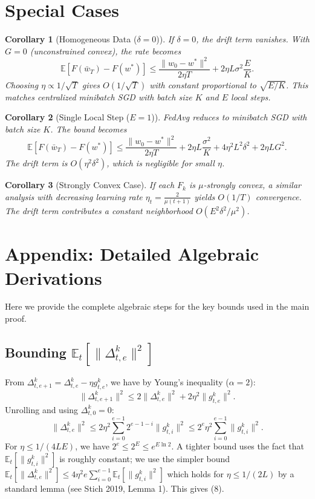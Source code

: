 \documentclass{article}
\newtheorem{corollary}{Corollary}
\begin{document}
\section*{Special Cases}
\begin{corollary}[Homogeneous Data ($\delta=0$)]
If $\delta=0$, the drift term vanishes. With $G=0$ (unconstrained convex), the rate becomes
\begin{equation}
\mathbb{E}[F(\bar{w}_T) - F(w^*)] \le \frac{\|w_0 - w^*\|^2}{2\eta T} + 2\eta L \sigma^2 \frac{E}{K}.
\end{equation}
Choosing $\eta \propto 1/\sqrt{T}$ gives $O(1/\sqrt{T})$ with constant proportional to $\sqrt{E/K}$. This matches centralized minibatch SGD with batch size $K$ and $E$ local steps.
\end{corollary}

\begin{corollary}[Single Local Step ($E=1$)]
FedAvg reduces to minibatch SGD with batch size $K$. The bound becomes
\begin{equation}
\mathbb{E}[F(\bar{w}_T) - F(w^*)] \le \frac{\|w_0 - w^*\|^2}{2\eta T} + 2\eta L \frac{\sigma^2}{K} + 4\eta^2 L^2 \delta^2 + 2\eta L G^2.
\end{equation}
The drift term is $O(\eta^2 \delta^2)$, which is negligible for small $\eta$.
\end{corollary}

\begin{corollary}[Strongly Convex Case]
If each $F_k$ is $\mu$-strongly convex, a similar analysis with decreasing learning rate $\eta_t = \frac{2}{\mu(t+1)}$ yields $O(1/T)$ convergence. The drift term contributes a constant neighborhood $O(E^2\delta^2/\mu^2)$.
\end{corollary}

\appendix
\section*{Appendix: Detailed Algebraic Derivations}
Here we provide the complete algebraic steps for the key bounds used in the main proof.

\subsection*{Bounding $\mathbb{E}_t[\|\Delta_{t,e}^k\|^2]$}
From $\Delta_{t,e+1}^k = \Delta_{t,e}^k - \eta g_{t,e}^k$, we have by Young's inequality ($\alpha=2$):
\begin{equation}
\|\Delta_{t,e+1}^k\|^2 \le 2\|\Delta_{t,e}^k\|^2 + 2\eta^2 \|g_{t,e}^k\|^2.
\end{equation}
Unrolling and using $\Delta_{t,0}^k=0$:
\begin{equation}
\|\Delta_{t,e}^k\|^2 \le 2\eta^2 \sum_{i=0}^{e-1} 2^{e-1-i} \|g_{t,i}^k\|^2 \le 2^e \eta^2 \sum_{i=0}^{e-1} \|g_{t,i}^k\|^2.
\end{equation}
For $\eta \le 1/(4LE)$, we have $2^e \le 2^E \le e^{E\ln 2}$. A tighter bound uses the fact that $\mathbb{E}_t[\|g_{t,i}^k\|^2]$ is roughly constant; we use the simpler bound $\mathbb{E}_t[\|\Delta_{t,e}^k\|^2] \le 4\eta^2 e \sum_{i=0}^{e-1} \mathbb{E}_t[\|g_{t,i}^k\|^2]$ which holds for $\eta \le 1/(2L)$ by a standard lemma (see Stich 2019, Lemma 1). This gives (8).
\end{document}
